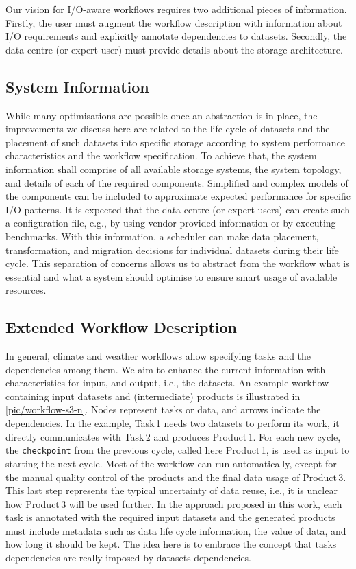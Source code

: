 \documentclass{superfri}
\begin{document}
Our vision for I/O-aware workflows requires two additional pieces of information.
Firstly, the user must augment the workflow description with information about I/O requirements and explicitly annotate dependencies to datasets.
Secondly, the data centre (or expert user) must provide details about the storage architecture.

\subsection{System Information}

While many optimisations are possible once an abstraction is in place, the improvements we discuss here are related to the life cycle of datasets and the placement of such datasets into specific storage according to system performance characteristics and the workflow specification.
To achieve that, the system information shall comprise of all available storage systems, the system topology, and details of each of the required components.
Simplified and complex models of the components can be included to approximate expected performance for specific I/O patterns.
It is expected that the data centre (or expert users) can create such a configuration file, e.g., by using vendor-provided information or by executing benchmarks.
With this information, a scheduler can make data placement, transformation, and migration decisions for individual datasets during their life cycle.
This separation of concerns allows us to abstract from the workflow what is essential and what a system should optimise to ensure smart usage of available resources.

\subsection{Extended Workflow Description}

In general, climate and weather workflows allow specifying tasks and the dependencies among them.
We aim to enhance the current information with characteristics for input, and output, i.e., the datasets.
An example workflow containing input datasets and (intermediate) products is illustrated in \cref{pic/workflow-s3-n}.
Nodes represent tasks or data, and arrows indicate the dependencies.
In the example, Task\,1 needs two datasets to perform its work, it directly communicates with Task\,2 and produces Product\,1.
For each new cycle, the \texttt{checkpoint} from the previous cycle, called here Product\,1, is used as input to starting the next cycle.
Most of the workflow can run automatically, except for the manual quality control of the products and the final data usage of Product\,3.
This last step represents the typical uncertainty of data reuse, i.e., it is unclear how Product\,3 will be used further.
In the approach proposed in this work, each task is annotated with the required input datasets and the generated products must include metadata such as data life cycle information, the value of data, and how long it should be kept.
The idea here is to embrace the concept that tasks dependencies are really imposed by datasets dependencies.
\end{document}
